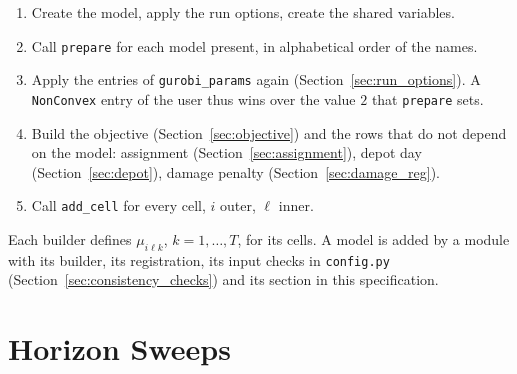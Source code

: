 \tabend

\begin{enumerate}[nosep,label=\arabic*.]
  \item Create the model, apply the run options, create the shared variables.
  \item Call \texttt{prepare} for each model present, in alphabetical order of the names.
  \item Apply the entries of \texttt{gurobi\_params} again (Section~\ref{sec:run_options}). A \texttt{NonConvex} entry of the user thus wins over the value $2$ that \texttt{prepare} sets.
  \item Build the objective (Section~\ref{sec:objective}) and the rows that do not depend on the model: assignment (Section~\ref{sec:assignment}), depot day (Section~\ref{sec:depot}), damage penalty (Section~\ref{sec:damage_reg}).
  \item Call \texttt{add\_cell} for every cell, $i$ outer, $\ell$ inner.
\end{enumerate}
Each builder defines $\mu_{i\ell k}$, $k = 1,\ldots,T$, for its cells. A model is added by a module with its builder, its registration, its input checks in \texttt{config.py} (Section~\ref{sec:consistency_checks}) and its section in this specification.


\section{Horizon Sweeps}
\label{sec:sweeps}

